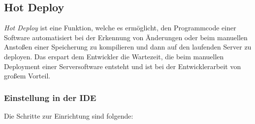 \subsection*{Hot Deploy}
\label{sec:hot_deploy}
       
\textit{Hot Deploy} ist eine Funktion, welche es ermöglicht, den Programmcode einer Software automatisiert bei der Erkennung von Änderungen oder beim manuellen Anstoßen einer Speicherung zu kompilieren und dann auf den laufenden Server zu deployen. Das erspart dem Entwickler die Wartezeit, die beim manuellen Deployment einer Serversoftware entsteht und ist bei der Entwicklerarbeit von großem Vorteil.

\subsubsection*{Einstellung in der \ac{IDE}}

Die Schritte zur Einrichtung sind folgende:

